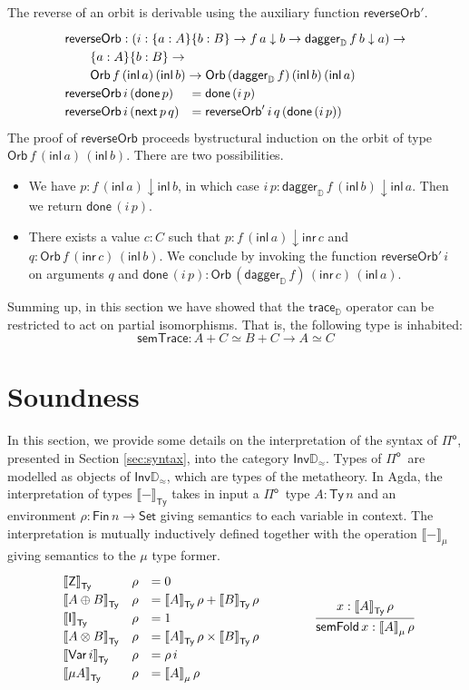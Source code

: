 \documentclass[runningheads,a4paper]{llncs}
\newcommand{\Pio}{\ensuremath{\mathsf{\Pi}^{\mathsf{o}}}}
\newcommand{\Set}{\mathsf{Set}}
\newcommand{\inl}{\mathsf{inl}}
\newcommand{\inr}{\mathsf{inr}}
\newcommand{\Inv}{\mathsf{Inv}}
\newcommand{\Ty}{\mathsf{Ty}}
\newcommand{\Var}{\mathsf{Var}}
\newcommand{\Z}{\mathsf{Z}}
\newcommand{\I}{\mathsf{I}}
\newcommand{\dn}{\downarrow}
\newcommand{\D}{\mathbb{D}}
\newcommand{\Dapprox}{\mathbb{D}_{\approx}}
\newcommand{\traceD}{\mathsf{trace}_\D}
\newcommand{\daggerD}{\mathsf{dagger}_\D}
\newcommand{\Orb}[3]{\mathsf{Orb}\,#1\,#2\,#3}
\newcommand{\done}{\mathsf{done}}
\renewcommand{\next}{\mathsf{next}}
\newcommand{\reverseOrbit}{\mathsf{reverseOrb}}
\newcommand{\semTy}[1]{{\llbracket #1 \rrbracket}_\mathsf{Ty}}
\newcommand{\semMu}[1]{{\llbracket #1 \rrbracket}_\mu}
\begin{document}
The reverse of an orbit is derivable using the auxiliary function $\reverseOrbit'$.
\[
\def\arraystretch{1.2}
\begin{array}{ll}
\multicolumn{2}{l}{\reverseOrbit : (i : \{a : A\} \{b : B\} \to f \,a
  \dn b \to \daggerD\,f  \,b \dn a) \to} \\
\multicolumn{2}{l}{\qquad \{a : A\} \{b : B\} \to} \\
\multicolumn{2}{l}{\qquad \Orb f {(\inl\,a)}
  {(\inl\,b)} \to \Orb  {(\daggerD\,f)} {(\inl\,b)} {(\inl\,a)}}\\
\reverseOrbit \,i\, (\done \,p) &= \done \, (i \,p) \\
\reverseOrbit \,i\,(\next\,p\,q) &= \reverseOrbit' \,i\,q \,(\done \,(i\,p))
\end{array}
\]
The proof of $\reverseOrbit$ proceeds bystructural induction on the
orbit of type
$\Orb f {(\inl\,a)} {(\inl\,b)}$. There are two possibilities.
\begin{itemize}
\item We have $p : f\,(\inl\,a) \dn
\inl\,b$, in which case $i\,p : \daggerD\,f\,(\inl\,b) \dn
\inl\,a$. Then we return $\done\,(i\,p)$.
\item There exists a value $c : C$ such that $p :
  f\,(\inl\,a) \dn \inr\,c$ and $q : \Orb f {(\inr\,c)}
  {(\inl\,b)}$. We conclude by invoking the function
  $\reverseOrbit' \,i$ on arguments $q$ and $\done\,(i\,p) : \Orb
  {(\daggerD \,f)} {(\inr\,c)} {(\inl\,a)}$.
\end{itemize}

Summing up, in this section we have showed that the $\traceD$ operator
can be restricted to act on partial isomorphisms. That is, the
following type is inhabited:
\[
\mathsf{semTrace} : A + C\simeq B + C \to A \simeq C
\]

\section{Soundness}\label{sec:interpretation}

In this section, we provide some details on the interpretation of the
syntax of \Pio, presented in Section \ref{sec:syntax}, into the
category $\Inv\Dapprox$. Types of \Pio\ are modelled as objects of
$\Inv\Dapprox$, which are types of the metatheory. In Agda, the
interpretation of types $\semTy -$ takes in input a \Pio\ type
$A : \Ty\,n$ and an environment $\rho : \mathsf{Fin}\,n \to \Set$
giving semantics to each variable in context. The interpretation is
mutually inductively defined together with the operation $\semMu -$
giving semantics to the $\mu$ type former.
\[
\begin{array}{lll}
\semTy \Z & \rho & = 0 \\
\semTy {A \oplus B} & \rho & = \semTy A \,\rho+ \semTy B  \, \rho\\
\semTy \I & \rho & = 1 \\
\semTy {A \otimes B} & \rho & = \semTy A \,\rho \times \semTy B \,\rho\\
\semTy {\Var\,i} & \rho & = \rho\, i \\
\semTy {\mu A} & \rho & = \semMu A \,\rho
\end{array}
\qquad \qquad
\infer{\mathsf{semFold} \,x : \semMu A\,\rho}{x : \semTy A \, \rho}
\]
\end{document}
